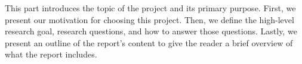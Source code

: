 This part introduces the topic of the project and its primary purpose. First, we present our motivation for choosing this project. Then, we define the high-level research goal, research questions, and how to answer those questions. Lastly, we present an outline of the report’s content to give the reader a brief overview of what the report includes.










